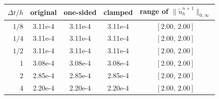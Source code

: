 \begin{tabular}{rcccc}
\toprule
$\Delta t/h$ & original & one-sided & clamped & range of $\|\tilde u_h^{n+1}\|_{0,\infty}$ \\
\midrule
$1/8$ & 3.11e-4 & 3.11e-4 & 3.11e-4 & $[2.00,\,2.00]$ \\
$1/4$ & 3.11e-4 & 3.11e-4 & 3.11e-4 & $[2.00,\,2.00]$ \\
$1/2$ & 3.11e-4 & 3.11e-4 & 3.11e-4 & $[2.00,\,2.00]$ \\
1 & 3.08e-4 & 3.08e-4 & 3.08e-4 & $[2.00,\,2.00]$ \\
2 & 2.85e-4 & 2.85e-4 & 2.85e-4 & $[2.00,\,2.00]$ \\
4 & 2.20e-4 & 2.20e-4 & 2.20e-4 & $[2.00,\,2.00]$ \\
\bottomrule
\end{tabular}
